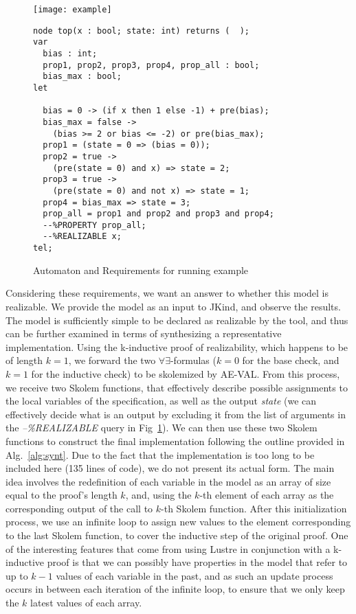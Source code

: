 \begin{figure}[H]
\begin{minipage}[c]{0.35\textwidth}
\centering
\texttt{[image: example]}
\end{minipage}
\begin{minipage}[c]{0.7\textwidth}
 \begin{Verbatim}[fontsize=\scriptsize]
node top(x : bool; state: int) returns (  );
var
  bias : int;
  prop1, prop2, prop3, prop4, prop_all : bool;
  bias_max : bool;
let

  bias = 0 -> (if x then 1 else -1) + pre(bias);
  bias_max = false ->
	(bias >= 2 or bias <= -2) or pre(bias_max);
  prop1 = (state = 0 => (bias = 0));
  prop2 = true ->
  	(pre(state = 0) and x) => state = 2;
  prop3 = true ->
  	(pre(state = 0) and not x) => state = 1;
  prop4 = bias_max => state = 3;
  prop_all = prop1 and prop2 and prop3 and prop4;
  --%PROPERTY prop_all;
  --%REALIZABLE x;
tel;
 \end{Verbatim}
\end{minipage}
\caption{Automaton and Requirements for running example}
\label{fg:example}
\end{figure}

Considering these requirements, we want an answer to whether this model is
realizable. We provide the model as an input to JKind, and observe the results.
The model is sufficiently simple to be declared as realizable by the tool, and
thus can be further examined in terms of synthesizing a representative
implementation. Using the k-inductive proof of realizability, which happens to
be of length $k = 1$, we forward the two $\forall\exists$-formulas ($k=0$ for
the base check, and $k=1$ for the inductive check) to be skolemized by AE-VAL.
From this process, we receive two Skolem functions, that effectively describe
possible assignments to the local variables of the specification, as well as the
output \textit{state} (we can effectively decide what is an output by excluding
it from the list of arguments in the \textit{--\%REALIZABLE} query in
Fig~\ref{fg:example}).
We can then use these two Skolem functions to construct the final implementation
following the outline provided in Alg.~\ref{alg:synt}. Due to the fact that the
implementation is too long to be included here (135 lines of code), we do not
present its actual form. The main idea involves the redefinition of each
variable in the model as an array of size equal to the proof's length $k$, and,
using the $k$-th element of each array as the corresponding output of the call
to $k$-th Skolem function. After this initialization process, we use an infinite
loop to assign new values to the element corresponding to the last Skolem
function, to cover the inductive step of the original proof. One of the
interesting features that come from using Lustre in conjunction with a
k-inductive proof is that we can possibly have properties in the model that
refer to up to $k-1$ values of each variable in the past, and as such an update
process occurs in between each iteration of the infinite loop, to ensure that we
only keep the $k$ latest values of each array.
